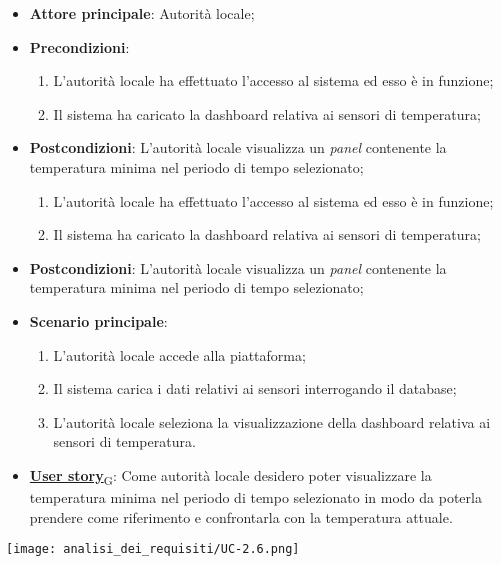 \begin{itemize}
	\item \textbf{Attore principale}: Autorità locale;
	\item \textbf{Precondizioni}:
	      \begin{enumerate}
		      \item L'autorità locale ha effettuato l'accesso al sistema ed esso è in funzione;
		      \item Il sistema ha caricato la dashboard relativa ai sensori di temperatura;
	      \end{enumerate}
	\item \textbf{Postcondizioni}: L'autorità locale visualizza un \textit{panel} contenente la temperatura minima nel periodo di tempo selezionato;
	      \begin{enumerate}
		      \item L'autorità locale ha effettuato l'accesso al sistema ed esso è in funzione;
		      \item Il sistema ha caricato la dashboard relativa ai sensori di temperatura;
	      \end{enumerate}
	\item \textbf{Postcondizioni}: L'autorità locale visualizza un \textit{panel} contenente la temperatura minima nel periodo di tempo selezionato;
	\item \textbf{Scenario principale}:
	      \begin{enumerate}
		      \item L'autorità locale accede alla piattaforma;
		      \item Il sistema carica i dati relativi ai sensori interrogando il database;
		      \item L'autorità locale seleziona la visualizzazione della dashboard relativa ai sensori di temperatura.
	      \end{enumerate}
	\item \href{https://7last.github.io/docs/rtb/documentazione-interna/glossario\#user-story}{\textbf{User story}\textsubscript{G}}:
	      Come autorità locale desidero poter visualizzare la temperatura minima nel periodo di tempo selezionato
	      in modo da poterla prendere come riferimento e confrontarla con la temperatura attuale.
\end{itemize}
\begin{center}
	\texttt{[image: analisi\_dei\_requisiti/UC-2.6.png]}
\end{center}

